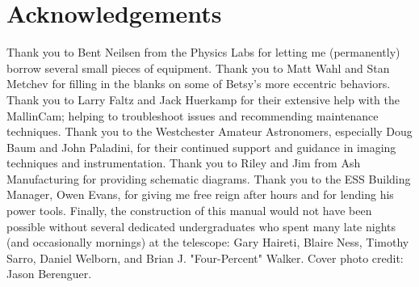 \documentclass[12pt,titlepage]{article}
\begin{document}
\section*{Acknowledgements}
\thispagestyle{empty}

Thank you to Bent Neilsen from the Physics Labs for letting me (permanently) borrow several small pieces of equipment.
Thank you to Matt Wahl and Stan Metchev for filling in the blanks on some of Betsy's more eccentric behaviors.
Thank you to Larry Faltz and Jack Huerkamp for their extensive help with the MallinCam; helping to troubleshoot issues and recommending maintenance techniques.
Thank you to the Westchester Amateur Astronomers, especially Doug Baum and John Paladini, for their continued support and guidance in imaging techniques and instrumentation.
Thank you to Riley and Jim from Ash Manufacturing for providing schematic diagrams.
Thank you to the ESS Building Manager, Owen Evans, for giving me free reign after hours and for lending his power tools.
Finally, the construction of this manual would not have been possible without several dedicated
undergraduates who spent many late nights (and occasionally mornings) at the
telescope: Gary Haireti, Blaire Ness, Timothy Sarro, Daniel Welborn, and
Brian J. "Four-Percent" Walker.
Cover photo credit: Jason Berenguer.		

\clearpage





\end{document}
